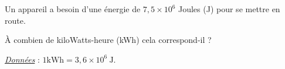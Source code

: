 
Un appareil a besoin d'une énergie de $7,5 \times 10^{6}$ Joules (J) pour se mettre en route.

À combien de kiloWatts-heure (kWh) cela correspond-il ?

\smallskip

\hfill{}\underline{\textit{Données}} : $1 \text{kWh}=3,6 \times 10^{6}~ \text{J}$.

\smallskip

